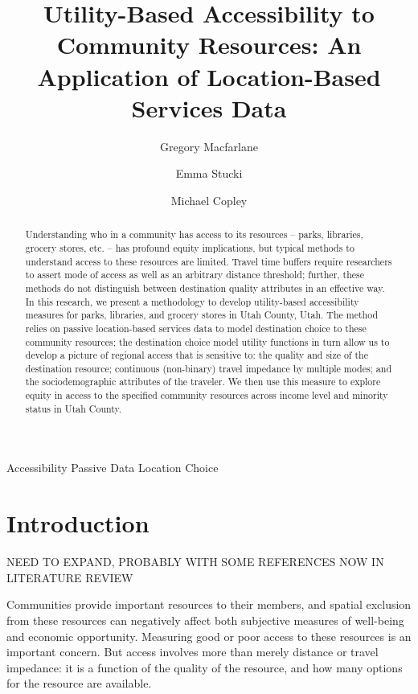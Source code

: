 \documentclass[3p, authoryear]{elsarticle} %
\begin{document}
\begin{frontmatter}

  \title{Utility-Based Accessibility to Community Resources: An Application of Location-Based Services Data}
    \author[BYU]{Gregory Macfarlane}
    \author[BYU]{Emma Stucki}
    \author[BYU]{Michael Copley}
  
    \author[]{}
  
  
  \begin{abstract}
  Understanding who in a community has access to its resources -- parks, libraries, grocery stores, etc. -- has profound equity implications, but typical methods to understand access to these resources are limited. Travel time buffers require researchers to assert mode of access as well as an arbitrary distance threshold; further, these methods do not distinguish between destination quality attributes in an effective way. In this research, we present a methodology to develop utility-based accessibility measures for parks, libraries, and grocery stores in Utah County, Utah. The method relies on passive location-based services data to model destination choice to these community resources; the destination choice model utility functions in turn allow us to develop a picture of regional access that is sensitive to: the quality and size of the destination resource; continuous (non-binary) travel impedance by multiple modes; and the sociodemographic attributes of the traveler. We then use this measure to explore equity in access to the specified community resources across income level and minority status in Utah County.
  \end{abstract}
   \begin{keyword} Accessibility Passive Data Location Choice\end{keyword}
 \end{frontmatter}

\hypertarget{intro}{%
\section{Introduction}\label{intro}}

NEED TO EXPAND, PROBABLY WITH SOME REFERENCES NOW IN LITERATURE REVIEW

Communities provide important resources to their members, and spatial exclusion
from these resources can negatively affect both subjective measures of well-being
\citep{currie2010modeling} and economic opportunity.
Measuring good or poor access to these resources is an important concern. But
access involves more than merely distance or travel impedance: it is a function
of the quality of the resource, and how many options for the resource are
available.
\end{document}
